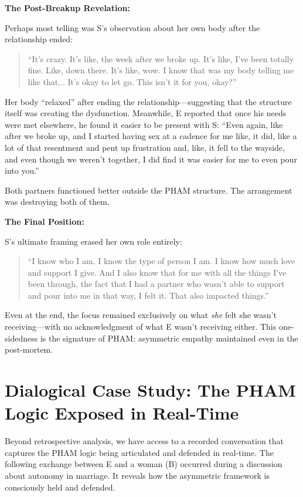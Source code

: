 \documentclass[12pt,openany]{book}
\numberwithin{equation}{chapter}
\begin{document}
\textbf{The Post-Breakup Revelation:}

Perhaps most telling was S's observation about her own body after the relationship ended:

\begin{quote}
``It's crazy. It's like, the week after we broke up. It's like, I've been totally fine. Like, down there. It's like, wow. I know that was my body telling me like that... It's okay to let go. This isn't it for you, okay?''
\end{quote}

Her body ``relaxed'' after ending the relationship---suggesting that the structure itself was creating the dysfunction. Meanwhile, E reported that once his needs were met elsewhere, he found it easier to be present with S: ``Even again, like after we broke up, and I started having sex at a cadence for me like, it did, like a lot of that resentment and pent up frustration and, like, it fell to the wayside, and even though we weren't together, I did find it was easier for me to even pour into you.''

Both partners functioned better outside the PHAM structure. The arrangement was destroying both of them.

\textbf{The Final Position:}

S's ultimate framing erased her own role entirely:

\begin{quote}
``I know who I am. I know the type of person I am. I know how much love and support I give. And I also know that for me with all the things I've been through, the fact that I had a partner who wasn't able to support and pour into me in that way, I felt it. That also impacted things.''
\end{quote}

Even at the end, the focus remained exclusively on what \textit{she} felt she wasn't receiving---with no acknowledgment of what E wasn't receiving either. This one-sidedness is the signature of PHAM: asymmetric empathy maintained even in the post-mortem.

\section{Dialogical Case Study: The PHAM Logic Exposed in Real-Time}

Beyond retrospective analysis, we have access to a recorded conversation that captures the PHAM logic being articulated and defended in real-time. The following exchange between E and a woman (B) occurred during a discussion about autonomy in marriage. It reveals how the asymmetric framework is consciously held and defended.
\end{document}
